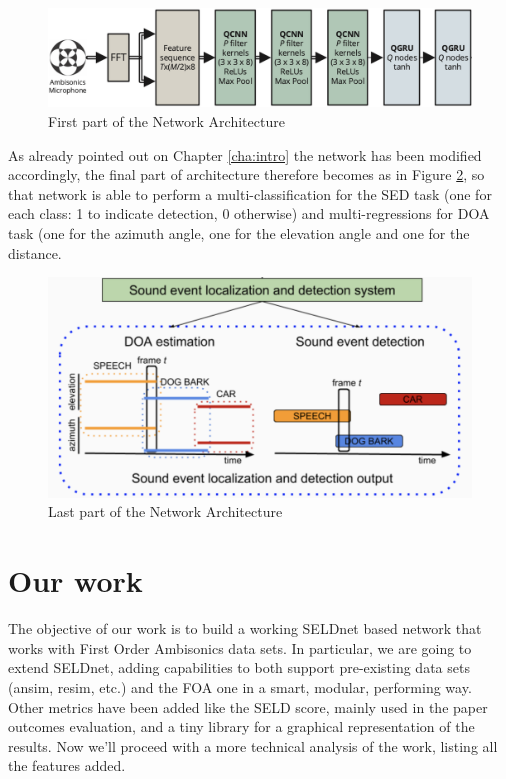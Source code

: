 \documentclass[11pt]{article}
\begin{document}
\begin{figure}[ht]
	\includegraphics[width=\linewidth]{img/arch1.png}
	\caption{First part of the Network Architecture}
	\label{fig:arch1}
\end{figure}

\noindent
As already pointed out on Chapter \ref{cha:intro} the network has been modified accordingly, the final part of architecture therefore becomes as in Figure \ref{fig:arch2}, so that network is able to perform a multi-classification for the SED task (one for each class: 1 to indicate detection, 0 otherwise) and multi-regressions for DOA task (one for the azimuth angle, one for the elevation angle and one for the distance.

\begin{figure}[ht]
	\centering
	\includegraphics[scale=0.5]{img/arch2.png}
	\caption{Last part of the Network Architecture}
	\label{fig:arch2}
\end{figure}

\newpage
\section{Our work}

The objective of our work is to build a working SELDnet based network that works with First Order Ambisonics data sets. In particular, we are going to extend SELDnet, adding capabilities to both support pre-existing data sets (ansim, resim, etc.) and the FOA one in a smart, modular, performing way. Other metrics have been added like the SELD score, mainly used in the paper \cite{paper2018} outcomes evaluation, and a tiny library for a graphical representation of the results. Now we'll proceed with a more technical analysis of the work, listing all the features added.
\end{document}
